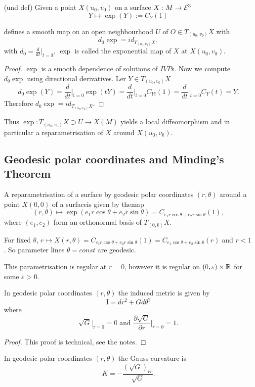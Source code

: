 \begin{lemma} (und def)
	Given a point $X(u_0,v_0)$ on a surface $X:M \to \mathcal E^3$
		\[ Y \mapsto \exp(Y):= C_Y(1) \]
		
	defines a smooth map on an open neighbourhood $U$ of $O \in T_{(u_0,v_0)}X$ with 		
		\[d_0\exp = id_{T_{(u_0,v_0)}X},\]
	with $d_0= \frac d{dt} \big |_{t=0} $.
	$\exp$ is called the exponential map of $X$ at $X(u_0,v_0)$.
\end{lemma}

\begin{proof}
	$\exp$ is a smooth dependence of solutions of $IVP$s. Now we compute $d_0\exp$ using directional derivatives. Ler $Y \in T_{(u_0,v_0)}X$
		\[ d_0\exp(Y) 
			= \frac d{dt} \big |_{t=0} \exp(tY) 
			= \frac d{dt}\big |_{t=0} C_{Yt}(1) 
			= \frac d{dt}\big |_{t=0} C_Y(t) 
			= Y. \]
	Therefore $d_0\exp = id_{T_{(u_0,v_0)}X}$.
\end{proof}

\begin{remark}
	Thus $\exp : T_{(u_0,v_0)}X \supset U \to X(M)$ yields a local diffeomorphism and in particular a reparametrisation of $X$ around $X(u_0,v_0)$.  
\end{remark}

\subsection{Geodesic polar coordinates and Minding's Theorem}

\begin{definition}
	A reparametrisation of a surface by geodesic polar coordinates $(r,\theta)$ around a point $X(0,0)$ of a surfaceis given by themap
		\[ (r,\theta) \mapsto \exp(e_1 r \cos\theta + e_2 r \sin \theta)
			=C_{e_1 r \cos\theta + e_2 r \sin \theta}(1), \]
	where $(e_1,e_2)$ form an orthonormal basis of $T_{(0,0)}X$.
	
	For fixed $\theta$, $r \mapsto X(r,\theta) = C_{e_1 r \cos\theta + e_2 r \sin \theta}(1) = C_{e_1 \cos\theta + e_2 \sin \theta}(r)$ and $r <1$.
	So parameter lines $\theta = const$ are geodesic.
\end{definition}

\begin{remark}
	This parametrisation is regular at $r=0$, however it is regular on $(0,\varepsilon) \times \mathbb R$ for some $\varepsilon>0$.
\end{remark}

\begin{lemma}
	In geodesic polar coordinates $(r,\theta)$ the induced metric is given by 
		\[ \mathrm I = dr^2 + Gd\theta^2  \]
	where 
		\[ \sqrt{G}\big |_{r=0} = 0 \text{ and }\frac {\partial \sqrt G}{\partial r} \big |_{r=0} = 1. \]
\end{lemma}

\begin{proof}
	This proof is technical, see the notes.
\end{proof}

\begin{example}
	In geodesic polar coordinates $(r,\theta)$ the Gauss curvature is 
		\[ K= - \frac {(\sqrt{G})_{rr}}{\sqrt G}. \]
\end{example}
